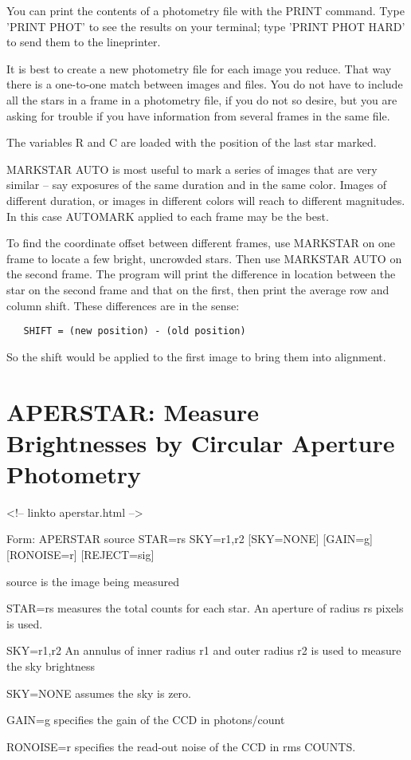You can print the contents of a photometry file with the PRINT command.
Type 'PRINT PHOT' to see the results on your terminal; type 'PRINT PHOT
HARD' to send them to the lineprinter.

It is best to create a new photometry file for each image you reduce.  That
way there is a one-to-one match between images and files.  You do not have
to include all the stars in a frame in a photometry file, if you do not so
desire, but you are asking for trouble if you have information from several
frames in the same file.

The variables R and C are loaded with the position of the last star marked.

MARKSTAR AUTO is most useful to mark a series of images that are very
similar -- say exposures of the same duration and in the same color.
Images of different duration, or images in different colors will reach to
different magnitudes.  In this case AUTOMARK applied to each frame may be
the best.

To find the coordinate offset between different frames, use MARKSTAR on one
frame to locate a few bright, uncrowded stars.  Then use MARKSTAR AUTO on
the second frame.  The program will print the difference in location
between the star on the second frame and that on the first, then print the
average row and column shift.  These differences are in the sense: 
\begin{verbatim}
   SHIFT = (new position) - (old position)
\end{verbatim}
So the shift would be applied to the first image to bring them into
alignment.

\section{APERSTAR: Measure Brightnesses by Circular Aperture Photometry}
\begin{rawhtml}
<!-- linkto aperstar.html -->
\end{rawhtml}
\begin{command}
  \item[Form: APERSTAR source STAR=rs SKY=r1,r2 {[SKY=NONE]} {[GAIN=g]} {[RONOISE=r]} {[REJECT=sig]}\hfill]{}
  \item[source]{is the image being measured}
  \item[STAR=rs]{measures the total counts for each star.
An aperture of radius rs pixels is used.}
  \item[SKY=r1,r2]{An annulus of inner radius r1 and outer
radius r2 is used to measure the sky brightness}
  \item[SKY=NONE]{assumes the sky is zero.}
  \item[GAIN=g]{specifies the gain of the CCD in photons/count}
  \item[RONOISE=r]{specifies the read-out noise of the CCD in rms COUNTS.}
\end{command}

